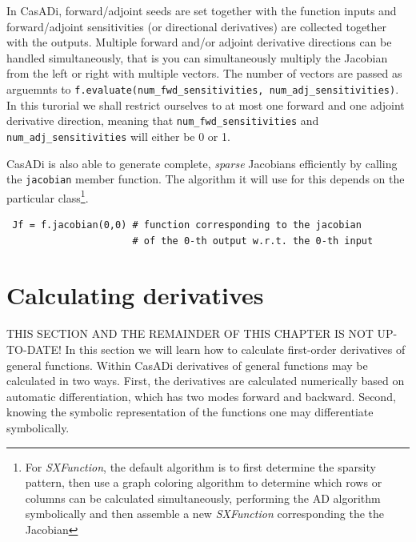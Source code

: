 \documentclass[a4paper,12pt]{book}
\begin{document}
{In CasADi, forward/adjoint seeds are set together with the function inputs and forward/adjoint sensitivities (or directional derivatives) are collected together with the outputs. Multiple forward and/or adjoint derivative directions can be handled simultaneously, that is you can simultaneously multiply the Jacobian from the left or right with multiple vectors. The number of vectors are passed as arguemnts to \texttt{f.evaluate(num\_fwd\_sensitivities, num\_adj\_sensitivities)}. In this turorial we shall restrict ourselves to at most one forward and one adjoint derivative direction, meaning that \texttt{num\_fwd\_sensitivities} and \texttt{num\_adj\_sensitivities} will either be 0 or 1.

CasADi is also able to generate complete, \emph{sparse} Jacobians efficiently by calling the \texttt{jacobian} member function. The algorithm it will use for this depends on the particular class\footnote{For \emph{SXFunction}, the default algorithm is to first determine the sparsity pattern, then use a graph coloring algorithm to determine which rows or columns can be calculated simultaneously, performing the AD algorithm symbolically and then assemble a new \emph{SXFunction} corresponding the the Jacobian}.
\begin{verbatim}
 Jf = f.jacobian(0,0) # function corresponding to the jacobian
                      # of the 0-th output w.r.t. the 0-th input
\end{verbatim}


\section{Calculating derivatives}
{\color{red}THIS SECTION AND THE REMAINDER OF THIS CHAPTER IS NOT UP-TO-DATE!}
In this section we will learn how to calculate first-order derivatives of general functions. Within CasADi derivatives of general
functions may be calculated in two ways. First, the derivatives are calculated numerically based on automatic differentiation,
 which has two modes forward and backward. Second, knowing the symbolic representation of the functions one may differentiate
 symbolically.

}
\end{document}

